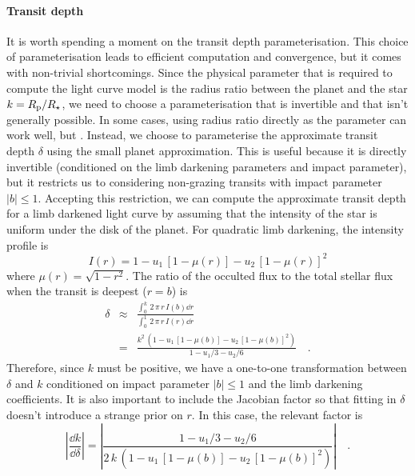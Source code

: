 \documentclass[linenumbers,floatfix,ApJL,twocolumn]{aastex631}
\begin{document}
\paragraph{Transit depth}
It is worth spending a moment on the transit depth parameterisation.
This choice of parameterisation leads to efficient computation and convergence, but it comes with non-trivial shortcomings.
Since the physical parameter that is required to compute the light curve model is the radius ratio between the planet and the star $k = R_{\rm p} / R_\star$, we need to choose a parameterisation that is invertible and that isn't generally possible.
In some cases, using radius ratio directly as the parameter can work well, but .
Instead, we choose to parameterise the approximate transit depth $\delta$ using the small planet approximation.
This is useful because it is directly invertible (conditioned on the limb darkening parameters and impact parameter), but it restricts us to considering non-grazing transits with impact parameter $|b| \le 1$.
Accepting this restriction, we can compute the approximate transit depth for a limb darkened light curve by assuming that the intensity of the star is uniform under the disk of the planet.
For quadratic limb darkening, the intensity profile is
\begin{equation}
  I(r) = 1 - u_1\,[1 - \mu(r)] - u_2\,[1 - \mu(r)]^2
\end{equation}
where $\mu(r) = \sqrt{1 - r^2}$.
The ratio of the occulted flux to the total stellar flux when the transit is deepest ($r = b$) is \citep[the same results are discussed by][]{Mandel:2002,Csizmadia:2013}
\begin{eqnarray}
  \delta &\approx& \frac{\int_0^k\,2\,\pi\,r\,I(b)\dd r}{\int_0^1\,2\,\pi\,r\,I(r)\dd r} \nonumber\\
  &=& \frac{k^2\,\left(1 - u_1\,[1 - \mu(b)] - u_2\,[1 - \mu(b)]^2\right)}{1 - u_1/3 - u_2/6}\quad.
\end{eqnarray}
Therefore, since $k$ must be positive, we have a one-to-one transformation between $\delta$ and $k$ conditioned on impact parameter $|b| \le 1$ and the limb darkening coefficients.
It is also important to include the Jacobian factor so that fitting in $\delta$ doesn't introduce a strange prior on $r$.
In this case, the relevant factor is
\begin{equation}
  \left|\frac{\dd k}{\dd \delta}\right| = \left|\frac{1 - u_1/3 - u_2/6}{2\,k\,\left(1 - u_1\,[1 - \mu(b)] - u_2\,[1 - \mu(b)]^2\right)}\right| \quad.
\end{equation}
\end{document}
